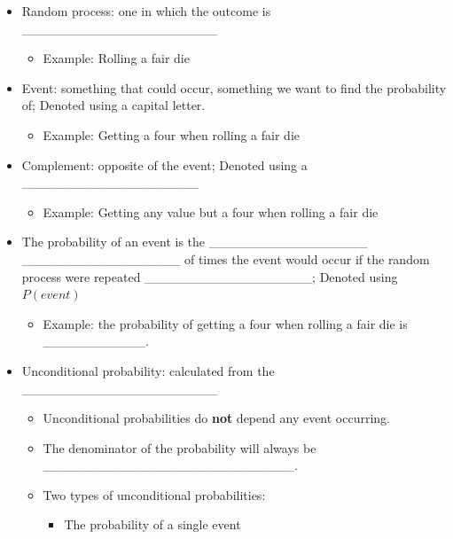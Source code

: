 \documentclass[
]{report}
\providecommand{\tightlist}{%
  \setlength{\itemsep}{0pt}\setlength{\parskip}{0pt}}
\begin{document}
\begin{itemize}
\item
  Random process: one in which the outcome is \_\_\_\_\_\_\_\_\_\_\_\_\_\_\_\_\_\_\_\_\_

  \begin{itemize}
  \tightlist
  \item
    Example: Rolling a fair die
  \end{itemize}
\item
  Event: something that could occur, something we want to find the probability of; Denoted using a capital letter.

  \begin{itemize}
  \tightlist
  \item
    Example: Getting a four when rolling a fair die
  \end{itemize}
\item
  Complement: opposite of the event; Denoted using a \_\_\_\_\_\_\_\_\_\_\_\_\_\_\_\_\_\_\_

  \begin{itemize}
  \tightlist
  \item
    Example: Getting any value but a four when rolling a fair die
  \end{itemize}
\item
  The probability of an event is the \_\_\_\_\_\_\_\_\_\_\_\_\_\_\_\_\_ \_\_\_\_\_\_\_\_\_\_\_\_\_\_\_\_\_ of times the event would occur if the random process were repeated \_\_\_\_\_\_\_\_\_\_\_\_\_\_\_\_\_\_; Denoted using \(P(event)\)

  \begin{itemize}
  \tightlist
  \item
    Example: the probability of getting a four when rolling a fair die is \_\_\_\_\_\_\_\_\_\_\_.
  \end{itemize}
\item
  Unconditional probability: calculated from the \_\_\_\_\_\_\_\_\_\_\_\_\_\_\_\_\_\_\_\_\_

  \begin{itemize}
  \item
    Unconditional probabilities do \textbf{not} depend any event occurring.
  \item
    The denominator of the probability will always be \_\_\_\_\_\_\_\_\_\_\_\_\_\_\_\_\_\_\_\_\_\_\_\_\_\_\_.
  \item
    Two types of unconditional probabilities:

    \begin{itemize}
    \item
      The probability of a single event


\end{itemize}
\end{itemize}
\end{itemize}
\end{document}
